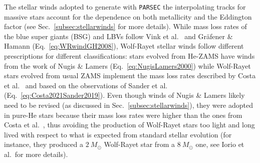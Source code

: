 \documentclass[a4paper,titlepage]{book}     	%
\newcommand{\sun}{\ensuremath{_\odot}}
\newcommand{\msun}{\ensuremath{M\sun}}
\newcommand{\micmap}[1]{\textcolor{red}{MM:\bf#1}}
\newcommand{\erika}[1]{\textcolor{green}{\bf#1}}
\begin{document}
The stellar winds adopted to generate with \texttt{PARSEC} the interpolating tracks for massive stars account for the dependence on  both metallicity and the Eddington factor (see Sec.\ \ref{subsec:stellarwinds} for more details). While mass loss rates of the blue super giants (BSG) and LBVs follow Vink et al.\ \cite{Vink2001} and Gr{\"a}fener \& Hamann \cite{G&H_WRmassloss} (Eq.\ \ref{eq:WRwindGH2008}), Wolf-Rayet stellar winds follow different prescriptions for different classifications: stars evolved from He-ZAMS have winds from the work of Nugis \& Lamers (Eq.\ \ref{eq:NugisLamers2000}) while Wolf-Rayet stars evolved from usual ZAMS implement the mass loss rates described by Costa et al.\ \cite{MassGapStellarEvo_Costa2021} and based on the observations of Sander et al.\ \cite{Sander2019_WRwinds} (Eq.\ \ref{eq:Costa2021Sander2019}). Even though winds of Nugis \& Lamers likely need to be revised (as discussed in Sec.\ \ref{subsec:stellarwinds}), they were adopted in pure-He stars because their mass loss rates were higher than the ones from Costa et al.\ , thus avoiding the production of Wolf-Rayet stars too light and long lived with respect to what is expected from standard stellar evolution (for instance, they produced a $2~\msun$ Wolf-Rayet star from a $8~\msun$ one, see Iorio et al.\ for more details). \\
\end{document}
